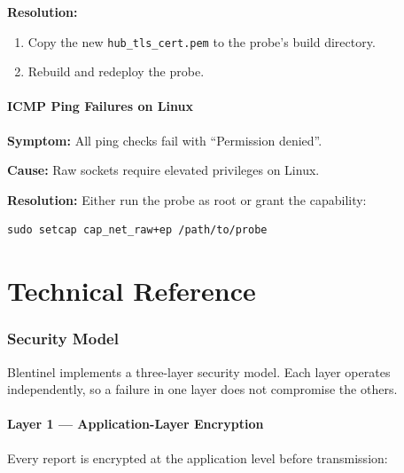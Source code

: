 \documentclass[12pt]{report}
\begin{document}
\textbf{Resolution:}
\begin{enumerate}
    \item Copy the new \texttt{hub\_tls\_cert.pem} to the probe's build
          directory.
    \item Rebuild and redeploy the probe.
\end{enumerate}

\subsection{ICMP Ping Failures on Linux}

\textbf{Symptom:} All ping checks fail with ``Permission denied''.

\textbf{Cause:} Raw sockets require elevated privileges on Linux.

\textbf{Resolution:} Either run the probe as root or grant the capability:

\begin{lstlisting}
sudo setcap cap_net_raw+ep /path/to/probe
\end{lstlisting}


\part{Technical Reference}
\setcounter{section}{0}

\section{Security Model}

Blentinel implements a three-layer security model. Each layer operates
independently, so a failure in one layer does not compromise the others.

\subsection{Layer 1 --- Application-Layer Encryption}

Every report is encrypted at the application level before transmission:
\end{document}
